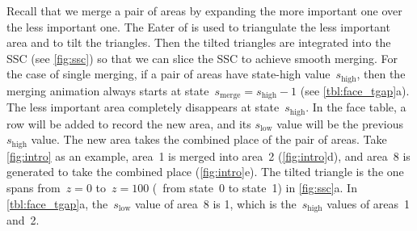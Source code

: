 \documentclass{ica}
\begin{document}
Recall that we merge a pair of areas by expanding 
the more important one over the less important one.
The Eater of \citet{Suba2014Merge} is used to 
triangulate the less important area and to tilt the triangles.
Then the tilted triangles are integrated into the SSC
(see \fig\ref{fig:ssc})
so that we can slice the SSC to achieve smooth merging.
For the case of single merging,
if a pair of areas have state-high value~$s_\mathrm{high}$,
then the merging animation 
always starts at state~$s_\mathrm{merge}=s_\mathrm{high}-1$
(see \tbl\ref{tbl:face_tgap}a).
The less important area completely disappears
at state~$s_\mathrm{high}$.
In the face table, a row will be added to record the new area, 
and its $s_\mathrm{low}$ value will be the previous~$s_\mathrm{high}$ value.
The new area takes the combined place of the pair of areas.
Take \fig\ref{fig:intro} as an example, 
area~1 is merged into area~2 (\figs\ref{fig:intro}d), 
and area~8 is generated to take the combined place (\figs\ref{fig:intro}e).
The tilted triangle is the one spans 
from~$z= 0$ to~$z=100$ (\ie~from state~0 to state~1)
in \fig\ref{fig:ssc}a.
In \tbl\ref{tbl:face_tgap}a, 
the~$s_\mathrm{low}$ value of area~8 is 1,
which is the~$s_\mathrm{high}$ values of areas~1 and~2.
\end{document}
